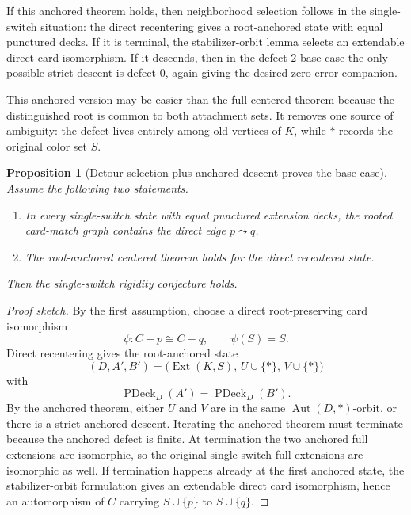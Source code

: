 \documentclass[11pt]{article}
\newtheorem{proposition}{Proposition}
\newcommand{\PDeck}{\operatorname{PDeck}}
\newcommand{\Ext}{\operatorname{Ext}}
\newcommand{\Aut}{\operatorname{Aut}}
\begin{document}
If this anchored theorem holds, then neighborhood selection follows in the
single-switch situation: the direct recentering gives a root-anchored state
with equal punctured decks.  If it is terminal, the stabilizer-orbit lemma
selects an extendable direct card isomorphism.  If it descends, then in the
defect-\(2\) base case the only possible strict descent is defect \(0\), again
giving the desired zero-error companion.

This anchored version may be easier than the full centered theorem because
the distinguished root is common to both attachment sets.  It removes one
source of ambiguity: the defect lives entirely among old vertices of \(K\),
while \(\ast\) records the original color set \(S\).

\begin{proposition}[Detour selection plus anchored descent proves the base case]
Assume the following two statements.

\begin{enumerate}[leftmargin=2em]
  \item In every single-switch state with equal punctured extension decks, the
  rooted card-match graph contains the direct edge \(p\leadsto q\).

  \item The root-anchored centered theorem holds for the direct recentered
  state.
\end{enumerate}

Then the single-switch rigidity conjecture holds.
\end{proposition}

\begin{proof}[Proof sketch]
By the first assumption, choose a direct root-preserving card isomorphism
\[
  \psi:C-p\cong C-q,\qquad \psi(S)=S.
\]
Direct recentering gives the root-anchored state
\[
  (D,A',B')
  =
  \bigl(\Ext(K,S),\, U\cup\{\ast\},\, V\cup\{\ast\}\bigr)
\]
with
\[
  \PDeck_D(A')=\PDeck_D(B').
\]
By the anchored theorem, either \(U\) and \(V\) are in the same
\(\Aut(D,\ast)\)-orbit, or there is a strict anchored descent.  Iterating the
anchored theorem must terminate because the anchored defect is finite.  At
termination the two anchored full extensions are isomorphic, so the original
single-switch full extensions are isomorphic as well.  If termination happens
already at the first anchored state, the stabilizer-orbit formulation gives
an extendable direct card isomorphism, hence an automorphism of \(C\) carrying
\(S\cup\{p\}\) to \(S\cup\{q\}\).
\end{proof}
\end{document}
